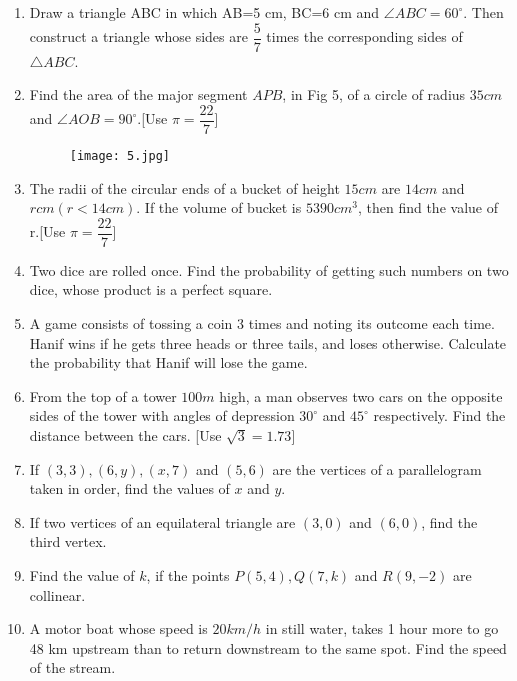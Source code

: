 \documentclass[12pt,-letter paper]{article}
\providecommand{\brak}[1]{\ensuremath{\left(#1\right)}}
\theoremstyle{remark}
\begin{document}
\begin{enumerate}
    \item Draw a triangle ABC in which AB=5 cm, BC=6 cm and $\angle ABC=60^\circ$. Then construct a triangle whose sides are $\dfrac{5}{7}$ times the corresponding sides of $\triangle ABC$.
    
    \item Find the area of the major segment $APB$, in Fig 5, of a circle of radius $35cm$ and $\angle AOB=90^\circ$.[Use $\pi=\dfrac{22}{7}$]
     \begin{figure}[h]
        \centering
        \texttt{[image: 5.jpg]}
    \end{figure}
    
    \item The radii of the circular ends of a bucket of height $15cm$ are $14cm$ and $r cm \brak{r<14cm}$. If the volume of bucket is $5390cm^3$, then find the value of r.[Use $\pi=\dfrac{22}{7}$]

    \item Two dice are rolled once. Find the probability of getting such numbers on two dice, whose product is a perfect square.
    \item A game consists of tossing a coin 3 times and noting its outcome each time. Hanif wins if he gets three heads or three tails, and loses otherwise. Calculate the probability that Hanif will lose the game.

    \item From the top of a tower $100m$ high, a man observes two cars on the
opposite sides of the tower with angles of depression $30^\circ$ and $45^\circ$ respectively. Find the distance between the cars. [Use $\sqrt{3}=1.73$]

    \item If $\brak{3,3},\brak{6,y},\brak{x,7}$ and $\brak{5,6}$ are the vertices of a parallelogram taken in order, find the values of $x$ and $y$.
    
    \item If two vertices of an equilateral triangle are $\brak{3,0}$ and $\brak{6,0}$, find the third vertex.
    
    \item Find the value of $k$, if the points $P\brak{5,4},Q\brak{7,k}$ and $R\brak{9,-2}$ are collinear.\newpage
    
 
    \item A motor boat whose speed is $20km/h$ in still water, takes 1 hour more to go 48 km upstream than to return downstream to the same spot. Find the speed of the stream.
     

\end{enumerate}
\end{document}
